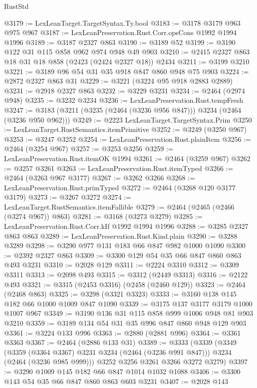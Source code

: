 \begin{lexlean}{RustStd}
\begin{coremodule}
@3179 := LexLeanTarget.TargetSyntax.Ty.bool
@3183 := @3178 @3179 @963 @975 @967
@3187 := LexLeanPreservation.Rust.Corr.opsCons @1992 @1994 @1996
@3189 := @3187 @2327 @863
@3190 := @3189 @52
@3199 := @3190 @122 @31 @115 @858 @962 @974 @948 @49 @903
@3210 := @2415 @2327 @863 @18 @31 @18 @858 (@2423 (@2424 @2327 @18)) @2434
@3211 := @3199 @3210
@3221 := @3189 @96 @54 @31 @35 @918 @847 @860 @948 @75 @903
@3224 := @2872 @2327 @863 @31
@3229 := @3221 (@3224 @95 @918 @2883 @2889)
@3231 := @2918 @2327 @863
@3232 := @3229 @3231
@3234 := @2464 (@2974 @948)
@3235 := @3232 @3234
@3236 := LexLeanPreservation.Rust.tempFresh
@3247 := @3183 (@3211 (@3235 (@2464 (@3236 @956 @847))) @3234 (@2464 (@3236 @950 @962)))
@3249 := @2223 LexLeanTarget.TargetSyntax.Prim
@3250 := LexLeanTarget.RustSemantics.itemPrimitive
@3252 := @3249 (@3250 @967)
@3253 := @3247 @3252
@3254 := LexLeanPreservation.Rust.plainItem
@3256 := @2464 (@3254 @967)
@3257 := @3253 @3256
@3259 := LexLeanPreservation.Rust.itemOK @1994
@3261 := @2464 (@3259 @967)
@3262 := @3257 @3261
@3263 := LexLeanPreservation.Rust.itemTyped
@3266 := @2464 (@3263 @967 @3177)
@3267 := @3262 @3266
@3268 := LexLeanPreservation.Rust.primTyped
@3272 := @2464 (@3268 @120 @3177 @3179)
@3273 := @3267 @3272
@3274 := LexLeanTarget.RustSemantics.itemFallible
@3279 := @2464 (@2465 (@2466 (@3274 @967)) @863)
@3281 := @3168 (@3273 @3279)
@3285 := LexLeanPreservation.Rust.Corr.kIf @1992 @1994 @1996
@3288 := @3285 @2327 @863 @863
@3289 := LexLeanPreservation.Rust.Kind.plain
@3290 := @3288 @3289
@3298 := @3290 @977 @131 @183 @66 @847 @982 @1000 @1090
@3300 := @2392 @2327 @863
@3309 := @3300 @129 @54 @35 @66 @847 @860 @863 @493 @3231
@3310 := @2028 @129
@3311 := @2224 @3310
@3312 := @3309 @3311
@3313 := @2098 @493
@3315 := @3312 (@2449 @3313)
@3316 := @2122 @493
@3321 := @3315 (@2453 @3316) (@2458 (@2460 @129))
@3323 := @2464 (@2468 @863)
@3325 := @3298 (@3321 @3323)
@3333 := @3160 @138 @145 @182 @66 @1000 @1009 @847 @1090
@3339 := @3175 @137 @3177 @3179 @1000 @1007 @967
@3349 := @3190 @136 @31 @115 @858 @999 @1006 @948 @81 @903 @3210
@3359 := @3189 @134 @54 @31 @35 @996 @847 @860 @948 @129 @903
@3361 := @3224 @133 @996
@3363 := @2880 (@2881 @996)
@3364 := @3361 @3363
@3367 := @2464 (@2886 @133 @31)
@3389 := @3333
    (@3339
      (@3349
        (@3359 (@3364 @3367) @3231 @3234 (@2464 (@3236 @991 @847)))
        @3234
        (@2464 (@3236 @985 @999)))
      @3252
      @3256
      @3261
      @3266
      @3272
      @3279)
@3397 := @3290 @1009 @145 @182 @66 @847 @1014 @1032 @1088
@3406 := @3300 @143 @54 @35 @66 @847 @860 @863 @603 @3231
@3407 := @2028 @143

\end{coremodule}
\end{lexlean}
